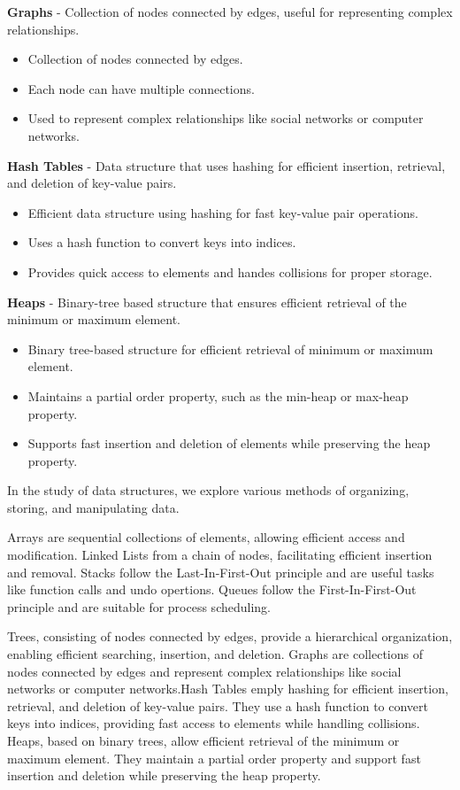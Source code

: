 \begin{solution}
    \textbf{Graphs} - Collection of nodes connected by edges, useful for representing complex relationships.
    \begin{itemize}
        \item Collection of nodes connected by edges.
        \item Each node can have multiple connections.
        \item Used to represent complex relationships like social networks or computer networks.
    \end{itemize}

    \textbf{Hash Tables} - Data structure that uses hashing for efficient insertion, retrieval, and deletion of
    key-value pairs.
    \begin{itemize}
        \item Efficient data structure using hashing for fast key-value pair operations.
        \item Uses a hash function to convert keys into indices.
        \item Provides quick access to elements and handes collisions for proper storage.
    \end{itemize}

    \textbf{Heaps} - Binary-tree based structure that ensures efficient retrieval of the minimum or maximum element.
    \begin{itemize}
        \item Binary tree-based structure for efficient retrieval of minimum or maximum element.
        \item Maintains a partial order property, such as the min-heap or max-heap property.
        \item Supports fast insertion and deletion of elements while preserving the heap property.
    \end{itemize}
\end{solution}

In the study of data structures, we explore various methods of organizing, storing, and manipulating data.

Arrays are sequential collections of elements, allowing efficient access and modification. Linked Lists from a chain of nodes, facilitating
efficient insertion and removal. Stacks follow the Last-In-First-Out principle and are useful tasks like function calls and undo opertions.
Queues follow the First-In-First-Out principle and are suitable for process scheduling.

Trees, consisting of nodes connected by edges, provide a hierarchical organization, enabling efficient searching, insertion, and deletion.
Graphs are collections of nodes connected by edges and represent complex relationships like social networks or computer networks.Hash Tables emply hashing for efficient insertion, retrieval, and deletion of key-value pairs. 
They use a hash function to convert keys into indices, providing fast access to elements while handling collisions. Heaps, based on binary trees, allow efficient retrieval of the minimum or maximum element. They maintain a 
partial order property and support fast insertion and deletion while preserving the heap property.

